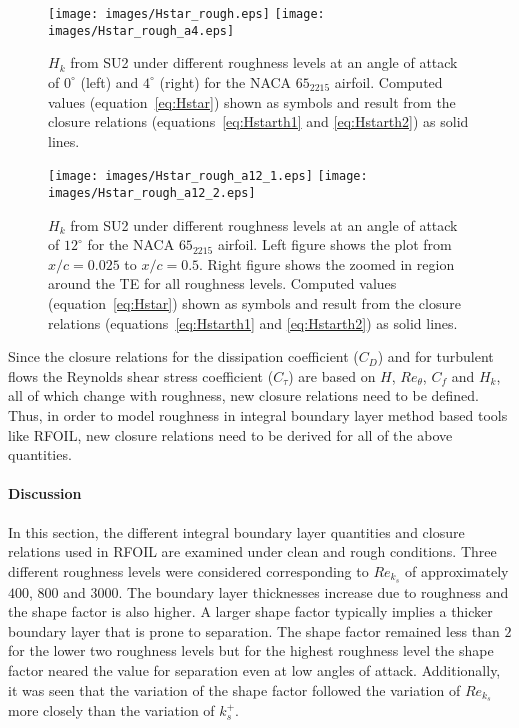\begin{figure}[h!]
    \centering
    \captionsetup{justification=centering}
    \texttt{[image: images/Hstar\_rough.eps]} 
    \texttt{[image: images/Hstar\_rough\_a4.eps]} 
    \caption{$H_k$ from SU2 under different roughness levels at an angle of attack of $0^{\circ}$ (left) and $4^{\circ}$ (right) for the NACA $65_2215$ airfoil. Computed values (equation~\ref{eq:Hstar}) shown as symbols and result from the closure relations (equations~\ref{eq:Hstarth1} and \ref{eq:Hstarth2}) as solid lines.}
    \label{fig:Hs_rough}
\end{figure}
\begin{figure}[h!]
    \centering
    \captionsetup{justification=centering}
    \texttt{[image: images/Hstar\_rough\_a12\_1.eps]} 
    \texttt{[image: images/Hstar\_rough\_a12\_2.eps]} 
    \caption{$H_k$ from SU2 under different roughness levels at an angle of attack of $12^{\circ}$ for the NACA $65_2215$ airfoil. Left figure shows the plot from $x/c=0.025$ to $x/c=0.5$. Right figure shows the zoomed in region around the TE for all roughness levels. Computed values (equation~\ref{eq:Hstar}) shown as symbols and result from the closure relations (equations~\ref{eq:Hstarth1} and \ref{eq:Hstarth2}) as solid lines.}
    \label{fig:Hs_rough2}
\end{figure}

Since the closure relations for the dissipation coefficient ($C_D$) and for turbulent flows the Reynolds shear stress coefficient ($C_{\tau}$) are based on $H$, $Re_{\theta}$, $C_f$ and $H_k$, all of which change with roughness, new closure relations need to be defined. Thus, in order to  model roughness in integral boundary layer method based tools like RFOIL, new closure relations need to be derived for all of the above quantities.

\paragraph*{Discussion}
In this section, the different integral boundary layer quantities and closure relations used in RFOIL are examined under clean and rough conditions. Three different roughness levels were considered corresponding to $Re_{k_s}$ of approximately $400$, $800$ and $3000$. The boundary layer thicknesses increase due to roughness and the shape factor is also higher. A larger shape factor typically implies a thicker boundary layer that is prone to separation. The shape factor remained less than $2$ for the lower two roughness levels but for the highest roughness level the shape factor neared the value for separation even at low angles of attack. Additionally, it was seen that the variation of the shape factor followed the variation of $Re_{k_s}$ more closely than the variation of $k_s^+$. 

